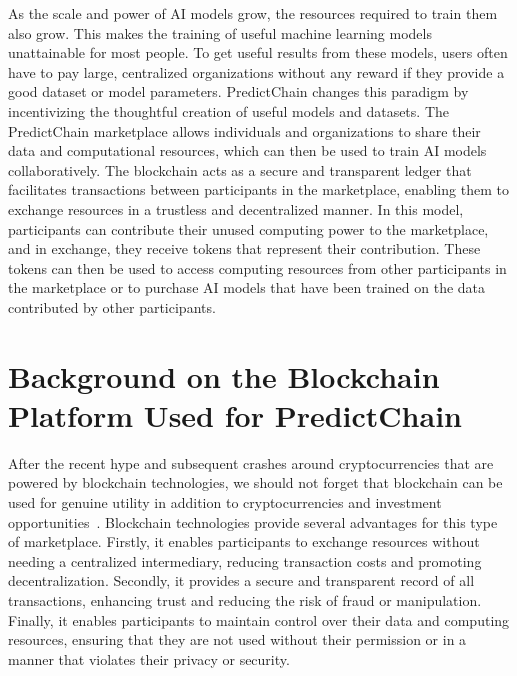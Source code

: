 \documentclass{ledger}
\begin{document}

As the scale and power of AI models grow, the resources required to train them also grow.  This makes the training of useful machine learning models unattainable for most people.  To get useful results from these models, users often have to pay large, centralized organizations without any reward if they provide a good dataset or model parameters.  PredictChain changes this paradigm by incentivizing the thoughtful creation of useful models and datasets.
The PredictChain marketplace allows individuals and organizations to share their data and computational resources, which can then be used to train AI models collaboratively. The blockchain acts as a secure and transparent ledger that facilitates transactions between participants in the marketplace, enabling them to exchange resources in a trustless and decentralized manner.
In this model, participants can contribute their unused computing power to the marketplace, and in exchange, they receive tokens that represent their contribution. These tokens can then be used to access computing resources from other participants in the marketplace or to purchase AI models that have been trained on the data contributed by other participants.

\section{Background on the Blockchain Platform Used for PredictChain}

After the recent hype and subsequent crashes around cryptocurrencies that are powered by blockchain technologies, we should not forget that blockchain can be used for genuine utility in addition to cryptocurrencies and investment opportunities~\cite{crosby2016blockchain}.
Blockchain technologies provide several advantages for this type of marketplace. Firstly, it enables participants to exchange resources without needing a centralized intermediary, reducing transaction costs and promoting decentralization. Secondly, it provides a secure and transparent record of all transactions, enhancing trust and reducing the risk of fraud or manipulation. Finally, it enables participants to maintain control over their data and computing resources, ensuring that they are not used without their permission or in a manner that violates their privacy or security.
\end{document}
